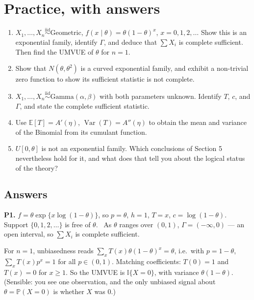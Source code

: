 \documentclass[11pt]{article}
\newcommand{\E}{\mathbb{E}}
\newcommand{\Var}{\operatorname{Var}}
\newcommand{\Prob}{\mathbb{P}}
\newcommand{\iid}{\overset{\text{iid}}{\sim}}
\newcommand{\I}{\mathbb{I}}
\begin{document}
\section{Practice, with answers}

\begin{enumerate}[label=\textbf{P\arabic*.}]
\item $X_1,\dots,X_n\iid\mathrm{Geometric}$, $f(x\mid\theta)=\theta(1-\theta)^{x}$,
$x=0,1,2,\dots$ Show this is an exponential family, identify $\Gamma$, and deduce that
$\sum X_i$ is complete sufficient. Then find the UMVUE of $\theta$ for $n=1$.

\item Show that $N(\theta,\theta^{2})$ is a curved exponential family, and exhibit a
non-trivial zero function to show its sufficient statistic is not complete.

\item $X_1,\dots,X_n\iid\mathrm{Gamma}(\alpha,\beta)$ with both parameters unknown. Identify
$T$, $c$, and $\Gamma$, and state the complete sufficient statistic.

\item Use $\E[T]=A'(\eta)$, $\Var(T)=A''(\eta)$ to obtain the mean and variance of the
Binomial from its cumulant function.

\item $U[0,\theta]$ is not an exponential family. Which conclusions of Section 5 nevertheless
hold for it, and what does that tell you about the logical status of the theory?
\end{enumerate}

\subsection*{Answers}

\noindent\textbf{P1.} $f=\theta\exp\{x\log(1-\theta)\}$, so $p=\theta$, $h=1$, $T=x$,
$c=\log(1-\theta)$. Support $\{0,1,2,\dots\}$ is free of $\theta$. \checkmark\ As $\theta$
ranges over $(0,1)$, $\Gamma=(-\infty,0)$ --- an open interval, so $\sum X_i$ is complete
sufficient.

For $n=1$, unbiasedness reads $\sum_x T(x)\theta(1-\theta)^{x}=\theta$, i.e.\ with $p=1-\theta$,
$\sum_x T(x)p^{x}=1$ for all $p\in(0,1)$. Matching coefficients: $T(0)=1$ and $T(x)=0$ for
$x\ge1$. So the UMVUE is $\boxed{\I\{X=0\}}$, with variance $\theta(1-\theta)$. (Sensible: you
see one observation, and the only unbiased signal about $\theta=\Prob(X=0)$ is whether $X$ was
$0$.)
\end{document}
